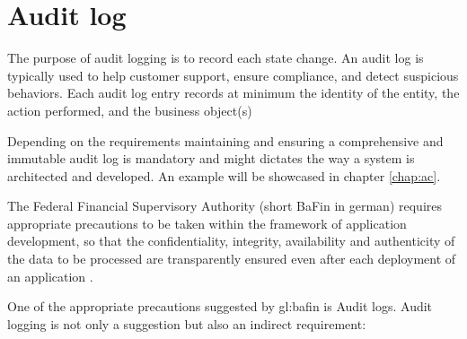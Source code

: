 

\section{Audit log} 

The purpose of audit logging is to record each state change. An audit log is typically used to help customer support, ensure compliance, and detect suspicious behaviors. Each audit log entry records at minimum the identity of the entity, the action performed, and the business object(s)~\citep{richardson2018microservices}

Depending on the requirements maintaining and ensuring a comprehensive and immutable audit log is mandatory and might dictates the way a system is architected and developed. An example will be showcased in chapter \ref{chap:ac}.

The Federal Financial Supervisory Authority (short BaFin in german) requires appropriate precautions to be taken within the framework of application development, so that the confidentiality, integrity, availability and authenticity of the data to be processed are transparently ensured even after each deployment of an application \citep{BaFinZAIT}. 



One of the appropriate precautions suggested by \gls{gl:bafin} is Audit logs. Audit logging is not only a suggestion but also an indirect requirement:

